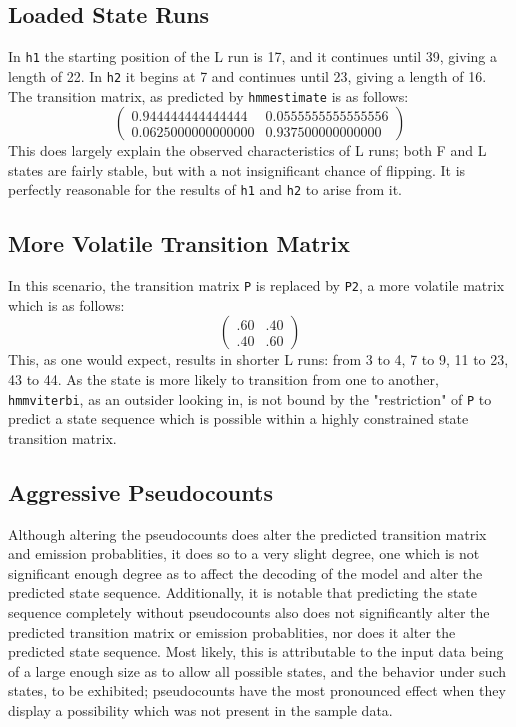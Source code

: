 \documentclass[titlepage]{scrartcl}
\begin{document}
\subsection{Loaded State Runs}
In \verb|h1| the starting position of the L run is 17, and it continues until 39, giving a length of 22.  In \verb|h2| it begins at 7 and continues until 23, giving a length of 16.  The transition matrix, as predicted by \verb|hmmestimate| is as follows:
\[\begin{pmatrix}
	0.944444444444444 & 0.0555555555555556 \\
	0.0625000000000000 & 0.937500000000000
\end{pmatrix}\]
This does largely explain the observed characteristics of L runs; both F and L states are fairly stable, but with a not insignificant chance of flipping.  It is perfectly reasonable for the results of \verb|h1| and \verb|h2| to arise from it.
\subsection{More Volatile Transition Matrix}
In this scenario, the transition matrix \verb|P| is replaced by \verb|P2|, a more volatile matrix which is as follows:
\[
\begin{pmatrix}
	.60 & .40 \\
	.40 & .60
\end{pmatrix}
\]
This, as one would expect, results in shorter L runs: from 3 to 4, 7 to 9, 11 to 23, 43 to 44.  As the state is more likely to transition from one to another, \verb|hmmviterbi|, as an outsider looking in, is not bound by the "restriction" of \verb|P| to predict a state sequence which is possible within a highly constrained state transition matrix.
\subsection{Aggressive Pseudocounts}
Although altering the pseudocounts does alter the predicted transition matrix and emission probablities, it does so to a very slight degree, one which is not significant enough degree as to affect the decoding of the model and alter the predicted state sequence. Additionally, it is notable that predicting the state sequence completely without pseudocounts also does not significantly alter the predicted transition matrix or emission probablities, nor does it alter the predicted state sequence.  Most likely, this is attributable to the input data being of a large enough size as to allow all possible states, and the behavior under such states, to be exhibited; pseudocounts have the most pronounced effect when they display a possibility which was not present in the sample data.
\end{document}
